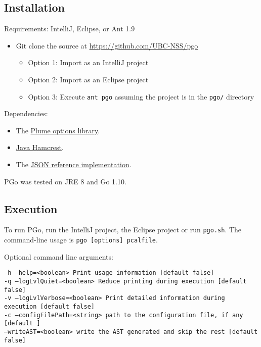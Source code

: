 \subsection{Installation}
Requirements: IntelliJ, Eclipse, or Ant 1.9

\begin{itemize}
\item Git clone the source at \url{https://github.com/UBC-NSS/pgo}

\begin{itemize}
\item Option 1: Import as an IntelliJ project

\item Option 2: Import as an Eclipse project

\item Option 3: Execute \texttt{ant pgo} assuming the project is in the \texttt{pgo/} directory
\end{itemize}
\end{itemize}

Dependencies:
\begin{itemize}
\item The \href{https://mernst.github.io/plume-lib/}
	{Plume options library}.

\item \href{http://hamcrest.org/JavaHamcrest/}
	{Java Hamcrest}.

\item The \href{https://github.com/stleary/JSON-java}
	{JSON reference implementation}.
\end{itemize}


PGo was tested on JRE 8 and Go 1.10.

\subsection{Execution}
To run PGo, run the IntelliJ project, the Eclipse project or run \texttt{pgo.sh}. The command-line usage is \texttt{pgo [options] pcalfile}.

Optional command line arguments:

\noindent
\texttt{-h --help=<boolean> Print usage information [default false]\\
	-q --logLvlQuiet=<boolean> Reduce printing during execution [default false]\\
	-v --logLvlVerbose=<boolean> Print detailed information during execution  [default false]\\
	-c --configFilePath=<string> path to the configuration file, if any [default ]\\
	--writeAST=<boolean> write the AST generated and skip the rest [default false]}

